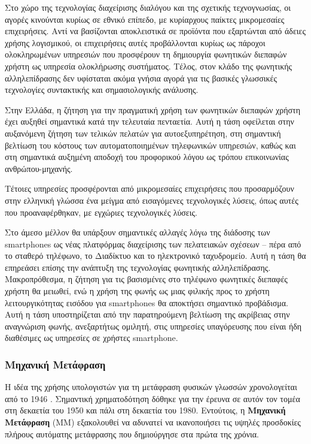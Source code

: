 \documentclass[]{../../metanetpaper}
\begin{document}
\begin{multicols}{2}
Στο χώρο της τεχνολογίας διαχείρισης διαλόγου και της σχετικής τεχνογνωσίας, οι αγορές κινούνται κυρίως σε εθνικό επίπεδο, με κυρίαρχους παίκτες μικρομεσαίες επιχειρήσεις. Αντί να βασίζονται αποκλειστικά σε προϊόντα που εξαρτώνται από άδειες χρήσης λογισμικού, οι επιχειρήσεις αυτές προβάλλονται κυρίως ως πάροχοι ολοκληρωμένων υπηρεσιών που προσφέρουν τη δημιουργία φωνητικών διεπαφών χρήστη ως υπηρεσία ολοκλήρωσης συστήματος. Τέλος, στον κλάδο της φωνητικής αλληλεπίδρασης δεν υφίσταται ακόμα γνήσια αγορά για τις βασικές γλωσσικές τεχνολογίες συντακτικής και σημασιολογικής ανάλυσης.

Στην Ελλάδα, η ζήτηση για την πραγματική χρήση των φωνητικών διεπαφών χρήστη έχει αυξηθεί σημαντικά κατά την τελευταία πενταετία. Αυτή η τάση οφείλεται στην αυξανόμενη ζήτηση των τελικών πελατών για αυτοεξυπηρέτηση, στη σημαντική βελτίωση του κόστους των αυτοματοποιημένων τηλεφωνικών υπηρεσιών, καθώς και στη σημαντικά αυξημένη αποδοχή του προφορικού λόγου ως τρόπου επικοινωνίας  ανθρώπου-μηχανής.

Τέτοιες υπηρεσίες προσφέρονται από μικρομεσαίες επιχειρήσεις που προσαρμόζουν στην ελληνική γλώσσα ένα μείγμα από εισαγόμενες τεχνολογικές λύσεις, όπως αυτές που προαναφέρθηκαν, με εγχώριες τεχνολογικές λύσεις.

Στο άμεσο μέλλον θα υπάρξουν σημαντικές αλλαγές λόγω της διάδοσης των smartphones ως νέας πλατφόρμας διαχείρισης των πελατειακών σχέσεων – πέρα από το σταθερό τηλέφωνο, το Διαδίκτυο και το ηλεκτρονικό ταχυδρομείο. Αυτή η τάση θα επηρεάσει επίσης την ανάπτυξη της τεχνολογίας φωνητικής αλληλεπίδρασης. Μακροπρόθεσμα, η ζήτηση για τις βασισμένες στο τηλέφωνο φωνητικές διεπαφές χρήστη θα μειωθεί, ενώ η χρήση της φωνής ως μιας φιλικής προς το χρήστη λειτουργικότητας εισόδου για smartphones θα αποκτήσει σημαντικό προβάδισμα. Αυτή η τάση υποστηρίζεται από την παρατηρούμενη βελτίωση της ακρίβειας στην αναγνώριση φωνής, ανεξαρτήτως ομιλητή, στις υπηρεσίες υπαγόρευσης που είναι ήδη διαθέσιμες ως υπηρεσίες σε χρήστες smartphone.

\subsubsection{Μηχανική Μετάφραση}

Η ιδέα της χρήσης υπολογιστών για τη μετάφραση φυσικών γλωσσών χρονολογείται από το 1946 . Σημαντική χρηματοδότηση δόθηκε για την έρευνα σε αυτόν τον τομέα στη δεκαετία του 1950 και πάλι στη δεκαετία του 1980. Εντούτοις, η \textbf{Μηχανική Μετάφραση} (ΜΜ) εξακολουθεί να αδυνατεί να ικανοποιήσει τις υψηλές προσδοκίες πλήρους αυτόματης μετάφρασης που δημιούργησε στα πρώτα της χρόνια.


\end{multicols}
\end{document}
